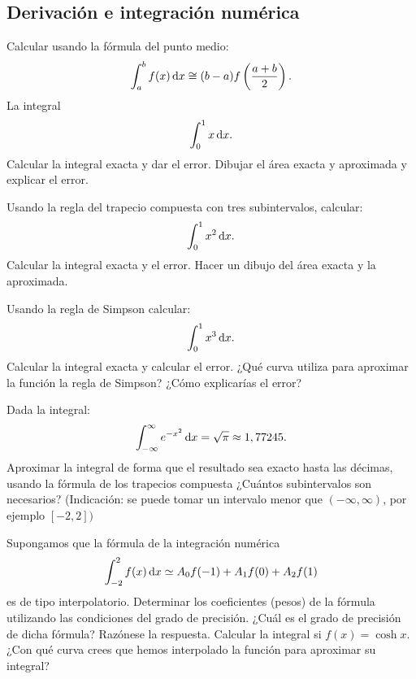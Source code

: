 \subsection{Derivación e integración numérica}

\begin{questions}
    \question

    Calcular usando la fórmula del punto medio:
    \begin{equation*}
        \int_a^b f(x) \dl x \cong(b-a) f\left(\frac{a+b}{2}\right).
    \end{equation*}
    La integral
    \begin{equation*}
        \int_0^1 x \dl x.
    \end{equation*}
    Calcular la integral exacta y dar el error. Dibujar el área exacta y aproximada y explicar el error.

    \question

    Usando la regla del trapecio compuesta con tres subintervalos, calcular:
    \begin{equation*}
        \int_0^1 x^2 \dl x.
    \end{equation*}
    Calcular la integral exacta y el error. Hacer un dibujo del área exacta y la aproximada.

    \question

    Usando la regla de Simpson calcular:
    \begin{equation*}
        \int_0^1 x^3 \dl x.
    \end{equation*}
    Calcular la integral exacta y calcular el error. ¿Qué curva utiliza para aproximar la función la regla de Simpson? ¿Cómo explicarías el error?

    \question

    Dada la integral:
    \begin{equation*}
        \int_{-\infty}^{\infty} e^{-x^2} \dl x=\sqrt{\pi} \approx 1,77245.
    \end{equation*}
    Aproximar la integral de forma que el resultado sea exacto hasta las décimas, usando la fórmula de los trapecios compuesta ¿Cuántos subintervalos son necesarios? (Indicación: se puede tomar un intervalo menor que $(-\infty, \infty)$, por ejemplo $[-2,2])$

    \question

    Supongamos que la fórmula de la integración numérica
    \begin{equation*}
        \int_{-2}^2 f(x) \dl x \simeq A_0 f(-1)+A_1 f(0)+A_2 f(1)
    \end{equation*}
    es de tipo interpolatorio.
    Determinar los coeficientes (pesos) de la fórmula utilizando las condiciones del grado de precisión. ¿Cuál es el grado de precisión de dicha fórmula? Razónese la respuesta. Calcular la integral si $f(x)=\cosh x$. ¿Con qué curva crees que hemos interpolado la función para aproximar su integral?


\end{questions}
